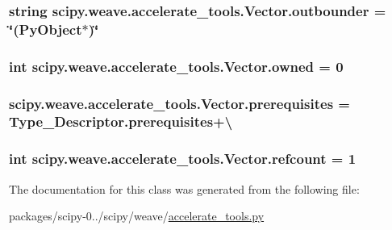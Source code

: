 \subsubsection[{outbounder}]{\setlength{\rightskip}{0pt plus 5cm}string scipy.\+weave.\+accelerate\+\_\+tools.\+Vector.\+outbounder = \char`\"{}(Py\+Object$\ast$)\char`\"{}\hspace{0.3cm}{\ttfamily [static]}}\label{classscipy_1_1weave_1_1accelerate__tools_1_1Vector_a4a58cb0e8eccaac994319ae8bf6fb3d5}
\hypertarget{classscipy_1_1weave_1_1accelerate__tools_1_1Vector_a097233e917013321ff56bc9b9433b74b}{}
\subsubsection[{owned}]{\setlength{\rightskip}{0pt plus 5cm}int scipy.\+weave.\+accelerate\+\_\+tools.\+Vector.\+owned = 0\hspace{0.3cm}{\ttfamily [static]}}\label{classscipy_1_1weave_1_1accelerate__tools_1_1Vector_a097233e917013321ff56bc9b9433b74b}
\hypertarget{classscipy_1_1weave_1_1accelerate__tools_1_1Vector_a6fcedee06407a0438743d8a54e40bc78}{}
\subsubsection[{prerequisites}]{\setlength{\rightskip}{0pt plus 5cm}scipy.\+weave.\+accelerate\+\_\+tools.\+Vector.\+prerequisites = Type\+\_\+\+Descriptor.\+prerequisites+\textbackslash{}\hspace{0.3cm}{\ttfamily [static]}}\label{classscipy_1_1weave_1_1accelerate__tools_1_1Vector_a6fcedee06407a0438743d8a54e40bc78}
\hypertarget{classscipy_1_1weave_1_1accelerate__tools_1_1Vector_a77102eb70a152214bd4301d94e069d2f}{}
\subsubsection[{refcount}]{\setlength{\rightskip}{0pt plus 5cm}int scipy.\+weave.\+accelerate\+\_\+tools.\+Vector.\+refcount = 1\hspace{0.3cm}{\ttfamily [static]}}\label{classscipy_1_1weave_1_1accelerate__tools_1_1Vector_a77102eb70a152214bd4301d94e069d2f}


The documentation for this class was generated from the following file\+:\begin{DoxyCompactItemize}
\item 
packages/scipy-\/0../scipy/weave/\hyperlink{accelerate__tools_8py}{accelerate\+\_\+tools.\+py}\end{DoxyCompactItemize}

